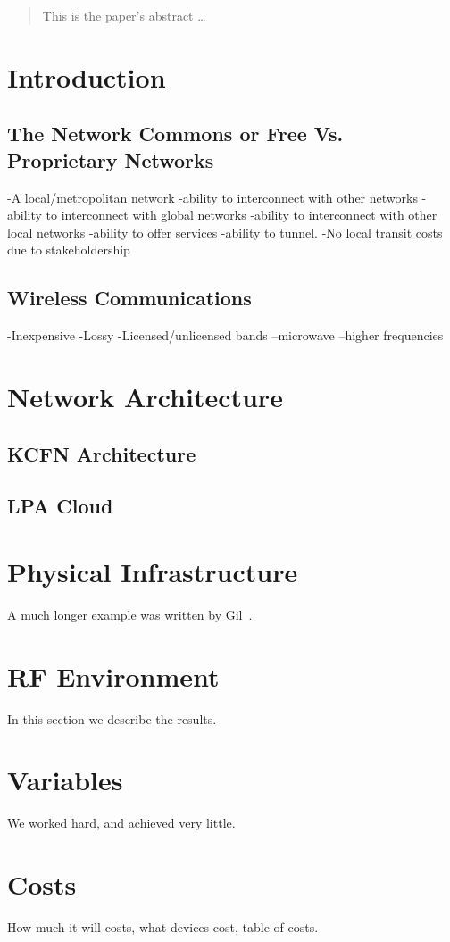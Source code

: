 \documentclass[12pt]{article}
\begin{document}
\maketitle

\begin{abstract}
This is the paper's abstract \ldots
\end{abstract}

\section{Introduction}\label{Introduction}
\subsection{The Network Commons or Free Vs. Proprietary Networks}
-A local/metropolitan network
-ability to interconnect with other networks
-ability to interconnect with global networks
-ability to interconnect with other local networks
-ability to offer services
-ability to tunnel.
-No local transit costs due to stakeholdership

\subsection{Wireless Communications}
-Inexpensive
-Lossy
-Licensed/unlicensed bands
--microwave
--higher frequencies


\section{Network Architecture}\label{Architecture}
\subsection{KCFN Architecture}
\subsection{LPA Cloud}

\section{Physical Infrastructure}\label{previous work}
A much longer \LaTeXe{} example was written by Gil~\cite{Gil:02}.

\section{RF Environment}\label{results}
In this section we describe the results.


\section{Variables}\label{conclusions}
We worked hard, and achieved very little.

\section{Costs}\label{costs}
How much it will costs, what devices cost, table of costs.
\end{document}
